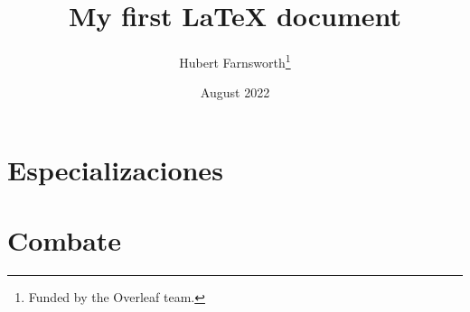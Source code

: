 \documentclass[12pt, a4paper]{report}
\title{My first LaTeX document}
\author{Hubert Farnsworth\thanks{Funded by the Overleaf team.}}
\date{August 2022}
\begin{document}
\maketitle

\chapter{Especializaciones}

\chapter{Combate}



\end{document}
